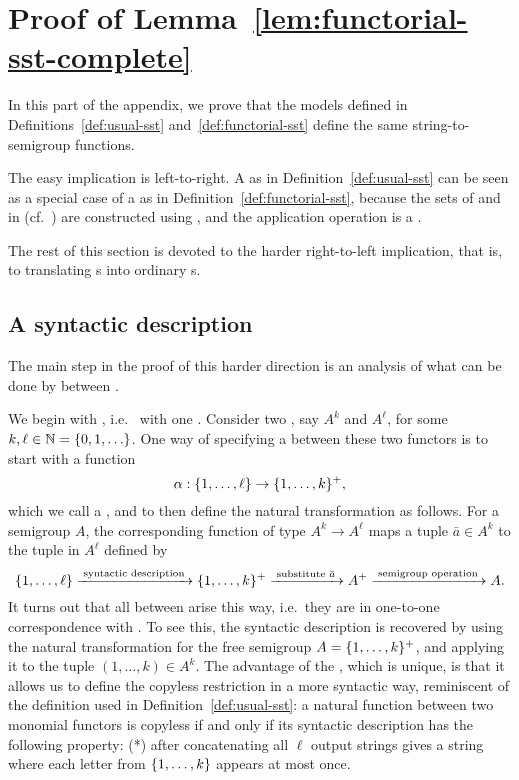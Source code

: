 \section{Proof of Lemma~\ref{lem:functorial-sst-complete}}
In this part of the appendix, we prove that the models defined in Definitions~\ref{def:usual-sst} and~\ref{def:functorial-sst} define the same string-to-semigroup functions.

The easy implication is left-to-right. 
    A  as in Definition~\ref{def:usual-sst} can be seen as a special case of a \functorialsst as in Definition~\ref{def:functorial-sst}, because the sets of  and  in  (cf.~) are constructed using , and the application operation is a . 

The rest of this section is devoted to the harder right-to-left implication, that is, to translating \functorialsst{}s into ordinary \sst{}s.

\subsection{A syntactic description}

The main step in the proof of this harder direction is an analysis of what can be done by  between .

\AP We begin with , i.e.~ with one . 
Consider two , say $A^k$ and $A^\ell$, for some  $k,\ell \in \mathbb{N} = \{0,1,\ldots\}$.
One way of specifying a  between these two functors is to start with a function 
\begin{equation}
\label{eq:syntactic-description}    \alpha : \{1,\ldots,\ell\} \to \{1,\ldots,k\}^+,
\end{equation}
which we call a , and to then  define the  natural transformation as follows. For a semigroup $A$, the corresponding function of type $A^k \to A^\ell$  maps a tuple $\bar a \in A^k$ to the tuple in $A^\ell$ defined by
\[
\{1,\ldots,\ell\}
\xrightarrow{\;\text{syntactic description}\;}
\{1,\ldots,k\}^+ 
\xrightarrow{\;\text{substitute $\bar a$}\;}
A^+
\xrightarrow{\;\text{semigroup operation}\;}
A.
\]
It turns out that all  between  arise this way, i.e.~they are in one-to-one correspondence with . To see this, the syntactic description is recovered by using the natural transformation for the free semigroup $A=\{1,\ldots,k\}^+$, and applying it to the tuple $(1,\ldots,k) \in A^k$.
The advantage of the , which is unique, is that it allows us to define the copyless restriction in a more syntactic way, reminiscent of the definition used in Definition~\ref{def:usual-sst}:  a natural function between two monomial functors is copyless if and only if its syntactic description has the following property: (*) after concatenating all $\ell$ output strings gives a string where each letter from $\{1,\ldots,k\}$ appears at most once. 

